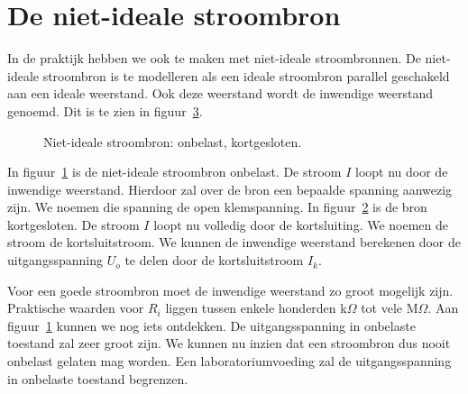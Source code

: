 \section{De niet-ideale stroombron}
\label{sec:gelnietidealestroombron}
In de praktijk hebben we ook te maken met niet-ideale stroombronnen. De niet-ideale
stroombron is te modelleren als een ideale stroombron parallel geschakeld aan een ideale
weerstand. Ook deze weerstand wordt de inwendige weerstand genoemd. Dit is te zien in
figuur~\ref{fig:gelnissopenkort}.

\begin{figure}[!ht]
\begin{subfigure}{0.5\textwidth}
\centering
{}
\caption{}
\label{fig:gelnissopen}
\end{subfigure}%
\begin{subfigure}{0.5\textwidth}
\centering
{}
\caption{}
\label{fig:gelnisskort}
\end{subfigure}
\caption{Niet-ideale stroombron:  onbelast,  kortgesloten.}
\label{fig:gelnissopenkort}
\end{figure}

In figuur~\ref{fig:gelnissopen} is de niet-ideale stroombron onbelast. De stroom $I$
loopt nu door de inwendige weerstand. Hierdoor zal over de bron een bepaalde spanning aanwezig
zijn. We noemen die spanning de open klemspanning. In figuur~\ref{fig:gelnisskort} is de bron
kortgesloten. De stroom $I$ loopt nu volledig door de kortsluiting. We noemen de stroom de
kortsluitstroom. We kunnen de inwendige
weerstand berekenen door de uitgangsspanning $U_o$ te delen door de kortsluitstroom $I_k$.

Voor een goede stroombron moet de inwendige weerstand zo groot mogelijk zijn. Praktische
waarden voor $R_i$ liggen tussen enkele honderden k$\Omega$ tot vele M$\Omega$. Aan
figuur~\ref{fig:gelnissopen} kunnen we nog iets ontdekken. De uitgangsspanning in onbelaste
toestand zal zeer groot zijn. We kunnen nu inzien dat een stroombron dus nooit onbelast gelaten
mag worden. Een laboratoriumvoeding zal de uitgangsspanning in onbelaste toestand begrenzen.

